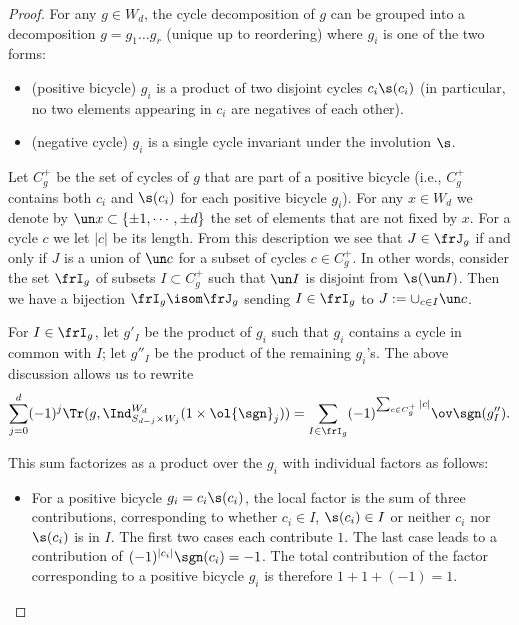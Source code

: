\begin{proof}
For any $g \in W_d$,  the cycle decomposition of $g$ can be grouped into a decomposition $g = g_1 \ldots g_r$ (unique up to reordering) where $g_i$ is one of the two forms:
\begin{itemize}
\item (positive bicycle) $g_i$ is a product of two disjoint cycles $c_{i}\s(c_{i})$ (in particular, no two elements appearing in $c_{i}$ are negatives of each other).
\item (negative cycle) $g_i$ is a single cycle invariant under the involution $\s$.
\end{itemize}
Let $C^{+}_{g}$ be the set of cycles of $g$ that are part of a positive bicycle (i.e., $C_g^+$ contains both $c_{i}$ and $\s(c_{i})$ for each positive bicycle $g_{i}$). For any $x\in W_{d}$ we denote by $\un x\subset \{\pm1,\cdots, \pm d\}$ the set of elements that are not fixed by $x$. For a cycle $c$ we let $|c|$ be its length. From this description we see that $J\in \frJ_{g}$ if and only if $J$ is a union of $\un c$ for a subset of cycles  $c\in C^{+}_{g}$. In other words, consider the set $\frI_{g}$ of subsets $I\subset C^{+}_{g}$ such that $\un I$ is disjoint from $\s(\un I)$. Then we have a bijection $\frI_{g}\isom \frJ_{g}$ sending $I\in \frI_{g}$ to $J:=\cup_{c\in I}\un c$.

For $I\in \frI_{g}$, let $g'_{I}$ be the product of  $g_{i}$ such that $g_{i}$ contains a cycle in common with $I$; let $g''_{I}$ be the product of the remaining $g_{i}$'s. The above discussion allows us to rewrite
\begin{equation}
\sum_{j=0}^{d}(-1)^{j}\Tr(g, \Ind_{S_{d-j} \times W_j}^{W_d} (1 \times \ol{\sgn}_j))=\sum_{I\in \frI_{g}}(-1)^{\sum_{c\in C^{+}_{g}}|c|}\ov\sgn(g''_{I}).
\end{equation}

This sum factorizes as a product over the $g_i$ with individual factors as follows: %
\begin{itemize}
\item For a positive bicycle $g_i = c_i \s(c_{i})$, the local factor is the sum of three contributions, corresponding to whether $c_{i}\in I$, $\s(c_{i})\in I$ or neither  $c_{i}$ nor $\s(c_{i})$ is in $I$. The first two cases each contribute $1$. The last case leads to a contribution of $(-1)^{|c_i|} \sgn(c_i)=-1$. The total contribution of the factor corresponding to a positive bicycle $g_{i}$ is therefore $1+1+(-1)=1$.


\end{itemize}
\end{proof}
